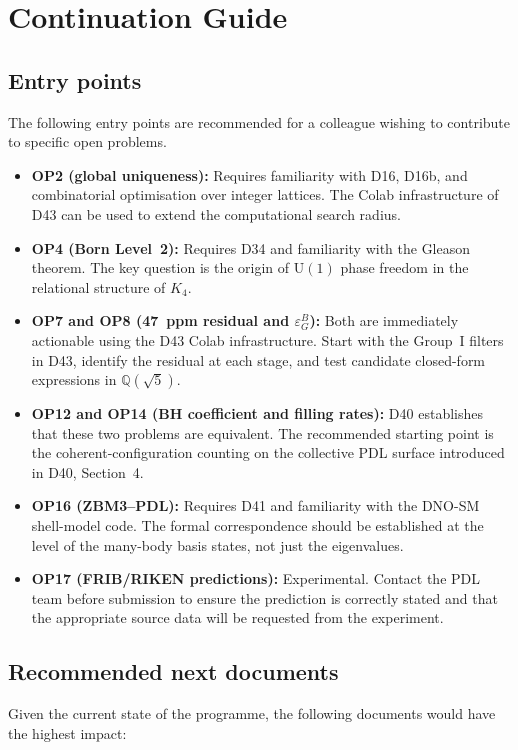 \documentclass[11pt,a4paper]{article}
\theoremstyle{plain}
\theoremstyle{definition}
\theoremstyle{remark}
\newcommand{\epsGeomB}{\varepsilon_G^B}
\begin{document}
\section{Continuation Guide}
\label{sec:continuation}

\subsection{Entry points}
\label{subsec:entrypoints}
The following entry points are recommended for a colleague wishing to contribute to specific open problems.

\begin{itemize}
\item \textbf{OP2 (global uniqueness):} Requires familiarity with D16, D16b, and combinatorial optimisation over integer lattices. The Colab infrastructure of D43 can be used to extend the computational search radius.
\item \textbf{OP4 (Born Level~2):} Requires D34 and familiarity with the Gleason theorem. The key question is the origin of $\mathrm{U}(1)$ phase freedom in the relational structure of $K_4$.
\item \textbf{OP7 and OP8 (47~ppm residual and $\epsGeomB$):} Both are immediately actionable using the D43 Colab infrastructure. Start with the Group~I filters in D43, identify the residual at each stage, and test candidate closed-form expressions in $\mathbb{Q}(\sqrt{5})$.
\item \textbf{OP12 and OP14 (BH coefficient and filling rates):} D40 establishes that these two problems are equivalent. The recommended starting point is the coherent-configuration counting on the collective PDL surface introduced in D40, Section~4.
\item \textbf{OP16 (ZBM3--PDL):} Requires D41 and familiarity with the DNO-SM shell-model code. The formal correspondence should be established at the level of the many-body basis states, not just the eigenvalues.
\item \textbf{OP17 (FRIB/RIKEN predictions):} Experimental. Contact the PDL team before submission to ensure the prediction is correctly stated and that the appropriate source data will be requested from the experiment.
\end{itemize}

\subsection{Recommended next documents}
\label{subsec:nextdocs}
Given the current state of the programme, the following documents would have the highest impact:
\end{document}
